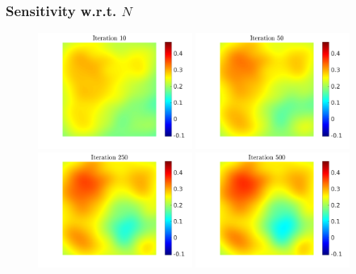 \begin{frame}
\frametitle{Sensitivity w.r.t. $N$}
\begin{figure}[t]
\centering
\includegraphics[width = 0.45\textwidth]{Images/ensemble_10}
\includegraphics[width = 0.45\textwidth]{Images/ensemble_50}
\\
\includegraphics[width = 0.45\textwidth]{Images/ensemble_250}
\includegraphics[width = 0.45\textwidth]{Images/ensemble_500}
\end{figure}
\end{frame}

